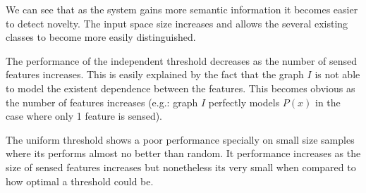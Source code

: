 We can see that as the system gains more semantic information it becomes easier
to detect novelty. The input space size increases and allows the several existing
classes to become more easily distinguished.

The performance of the independent threshold decreases as the number of sensed
features increases. This is easily explained by the fact that the graph $I$ is not
able to model the existent dependence between the features. This becomes obvious
as the number of features increases (e.g.: graph $I$ perfectly models $P(x)$ in the
case where only 1 feature is sensed).

The uniform threshold shows a poor performance specially on small size samples
where its performs almost no better than random.
It performance increases as the size of sensed features increases but nonetheless
its very small when compared to how optimal a threshold could be.



